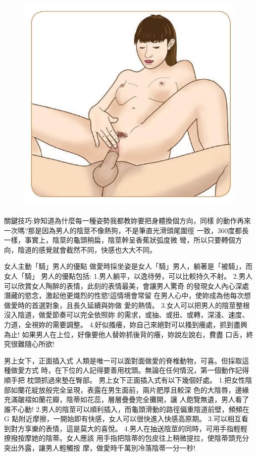 \documentclass[12pt,UTF8]{ctexbook}
\begin{document}
\begin{figure}[htbp]
	\centering
	\includegraphics[width=0.7\linewidth]{26}
	\caption{}
	\label{fig:1}
\end{figure}

關鍵技巧:妳知道為什麼每一種姿勢我都教妳要把身體換個方向，同樣
的動作再來一次嗎?那是因為男人的陰莖不像熱狗，不是筆直光滑頭尾圍徑
一致，360度都長一樣，事實上，陰莖的龜頭稍扁，陰莖幹呈香蕉狀弧度微
彎，所以只要轉個方向，陰道的感覺就會截然不同，快感也大大不同。

女人主動「騎」男人的優點
做愛時採坐姿是女人「騎」男人，躺著是「被騎」，而女人「騎」
男人的優點包括:
1.男人躺平，以逸待勞，可以比較持久不射。
2.男人可以欣賞女人陶醉的表情，此刻的表情最美，會讓男人驚奇
的發現女人內心深處潛藏的慾念，激起他更熾烈的性慾!這情境會常留
在男人心中，使妳成為他每次想做愛時的首選對象，且長久延續與妳做
愛的熱情。
3.女人可以把男人的陰莖整根沒入陰道，做愛節奏可以完全依照妳
的需求，或抽、或扭、或轉，深淺、速度、力道，全視妳的需要調整。
4.好似搔癢，妳自己來絕對可以搔到癢處，抓到盡興為止!
如果男人在上位，好像要他人替妳抓後背的癢，妳說左說右，費盡
口舌，終究很難隨心所欲!

男上女下，正面插入式
人類是唯一可以面對面做愛的脊椎動物，可喜。但採取這種做愛方式
時，在下位的人記得要善用枕頭。無論在任何情況，第一個動作記得順手把
枕頭抓過來墊在臀部。
男上女下正面插入式有以下幾個好處。
1.把女性陰部如蘭花綻放般完全呈現，表露在男生面前，兩片肥厚且較深
色的大陰唇，邊緣充滿皺褶如蘭花瓣，陰蒂如花蕊，層層疊疊完全攤開，讓
人飽覽無遺，男人看了誰不心動!
2.男人的陰莖可以順利插入，而龜頭滑動的路徑偏重陰道前壁，頻頻在G
點附近摩擦，一開始即有快感，女人可以很快進入快感高原期。
3.可以相互看到對方享樂的表情，這是莫大的喜悅。
4.男人在抽送陰莖的同時，可用手指輕輕撩撥按摩她的陰蒂。女人應該
用手指把陰蒂的包皮往上稍微提拉，使陰蒂頭充分突出外露，讓男人輕觸按
摩，做愛時千萬別冷落陰蒂一分一秒!
\end{document}
